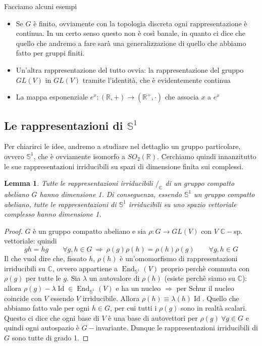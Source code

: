 \documentclass[11pt]{article}
\theoremstyle{plain}
\newtheorem{lemma}[thm]{Lemma}
\theoremstyle{definition}
\theoremstyle{remark}
\newcommand{\C}{\mathbb{C}}
\newcommand{\R}{\mathbb{R}}
\DeclareMathOperator{\End}{End}
\DeclareMathOperator{\Id}{Id}
\begin{document}
Facciamo alcuni esempi
\begin{itemize}
\item Se $G$ è finito, ovviamente con la topologia discreta ogni rappresentazione è continua. In un certo senso questo non è così banale, in quanto ci dice che quello che andremo a fare sarà una generalizzazione di quello che abbiamo fatto per gruppi finiti.
\item Un'altra rappresentazione del tutto ovvia: la rappresentazione del gruppo $GL(V)$ in $GL(V)$ tramite l'identità, che è evidentemente continua
\item La mappa esponenziale $e^x: (\R, +) \to (\R^+, \cdot )$ che associa $x$ a $e^x$
\end{itemize}



\subsection{Le rappresentazioni di $\mathbb{S}^1$}
Per chiarirci le idee, andremo a studiare nel dettaglio un gruppo particolare, ovvero $\mathbb{S}^1$, che è ovviamente isomorfo a $SO_2(\R)$. Cerchiamo quindi innanzitutto le sue rappresentazioni irriducibili su spazi di dimensione finita sui complessi. 

\begin{lemma}
Tutte le rappresentazioni irriducibili $/_\C$ di un gruppo compatto abeliano $G$ hanno dimensione 1. Di conseguenza, essendo $\mathbb{S}^1$ un gruppo compatto abeliano, tutte le rappresentazioni di $\mathbb{S}^1$ irriducibili su uno spazio vettoriale complesso hanno dimensione 1.
\end{lemma}
\begin{proof}
  $G$ è un gruppo compatto abeliano e sia $\rho:G\rightarrow GL(V)$ con $V$ $\C-$sp. vettoriale: quindi
  \[ gh = hg \qquad \forall g,h \in G \ \Rightarrow\ \rho(g)\rho(h) = \rho(h)\rho(g) \qquad \forall g, h \in G\]
  Il che vuol dire che, fissato $h$, $\rho(h)$ è un'omomorfismo di rappresentazioni irriducibili su $\C$, ovvero appartiene a $\End_{\mathbb{S}^1}(V)$ proprio perchè commuta con $\rho(g)$ per tutte le $g$. Sia $\lambda$ un autovalore di $\rho(h)$ (esiste perchè siamo su $\C$): allora $\rho(g)-\lambda \Id\in \End_{\mathbb{S}^1}(V)$ e ha un nucleo $\Rightarrow$ per Schur il nucleo coincide con $V$ essendo $V$ irriducibile. Allora $\rho(h) \equiv \lambda(h) \Id$. Quello che abbiamo fatto vale per ogni $h \in G$, per cui tutti i $\rho(g) $ sono in realtà scalari. Questo ci dice che ogni base di $V$ è una base di autovettori per $\rho(g)\ \forall g\in G$ e quindi ogni autospazio è $G-$invariante. Dunque le rappresentazioni irriducibili di $G$ sono tutte di grado 1.
\end{proof}
\end{document}

